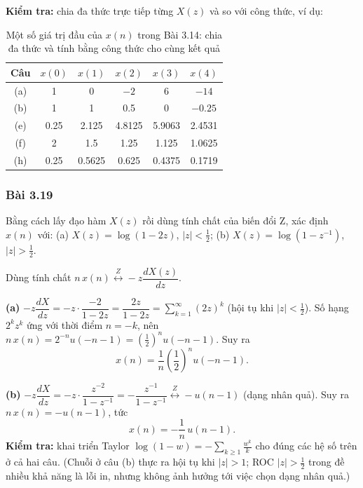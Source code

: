 \documentclass[12pt,a4paper]{article}
\newcommand{\zpair}{\overset{Z}{\longleftrightarrow}}
\begin{document}
\textbf{Kiểm tra:} chia đa thức trực tiếp từng $X(z)$ và so với công thức, ví dụ:
\begin{table}[H]
\centering
\small
\begin{tabular}{c|ccccc}
\toprule
Câu & $x(0)$ & $x(1)$ & $x(2)$ & $x(3)$ & $x(4)$ \\
\midrule
(a) & 1 & 0 & $-2$ & 6 & $-14$ \\
(b) & 1 & 1 & 0.5 & 0 & $-0.25$ \\
(e) & 0.25 & 2.125 & 4.8125 & 5.9063 & 2.4531 \\
(f) & 2 & 1.5 & 1.25 & 1.125 & 1.0625 \\
(h) & 0.25 & 0.5625 & 0.625 & 0.4375 & 0.1719 \\
\bottomrule
\end{tabular}
\caption{Một số giá trị đầu của $x(n)$ trong Bài 3.14: chia đa thức và tính bằng công thức cho cùng kết quả}
\end{table}

\subsubsection*{Bài 3.19}
\begin{mdframed}[style=exbox]
Bằng cách lấy đạo hàm $X(z)$ rồi dùng tính chất của biến đổi Z, xác định $x(n)$ với:
(a) $X(z) = \log(1 - 2z)$, $|z| < \frac{1}{2}$;
(b) $X(z) = \log(1 - z^{-1})$, $|z| > \frac{1}{2}$.
\end{mdframed}

Dùng tính chất $n\,x(n) \zpair -z\dfrac{dX(z)}{dz}$.

\textbf{(a)} $-z\dfrac{dX}{dz} = -z \cdot \dfrac{-2}{1 - 2z} = \dfrac{2z}{1 - 2z} = \sum_{k=1}^{\infty} (2z)^k$ (hội tụ khi $|z| < \frac{1}{2}$). Số hạng $2^k z^k$ ứng với thời điểm $n = -k$, nên $n\,x(n) = 2^{-n} u(-n-1) = \left(\frac{1}{2}\right)^n u(-n-1)$. Suy ra
\[
    x(n) = \frac{1}{n}\left(\frac{1}{2}\right)^n u(-n-1).
\]

\textbf{(b)} $-z\dfrac{dX}{dz} = -z \cdot \dfrac{z^{-2}}{1 - z^{-1}} = -\dfrac{z^{-1}}{1 - z^{-1}} \zpair -u(n-1)$ (dạng nhân quả). Suy ra $n\,x(n) = -u(n-1)$, tức
\[
    x(n) = -\frac{1}{n}\, u(n-1).
\]
\textbf{Kiểm tra:} khai triển Taylor $\log(1 - w) = -\sum_{k \ge 1} \frac{w^k}{k}$ cho đúng các hệ số trên ở cả hai câu. (Chuỗi ở câu (b) thực ra hội tụ khi $|z| > 1$; ROC $|z| > \frac{1}{2}$ trong đề nhiều khả năng là lỗi in, nhưng không ảnh hưởng tới việc chọn dạng nhân quả.)
\end{document}
